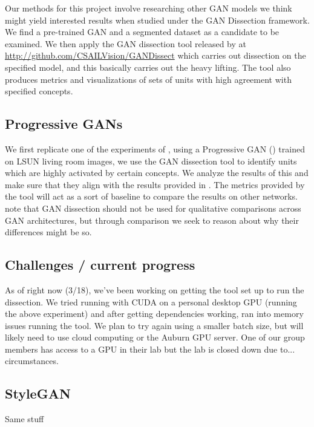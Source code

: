 \documentclass{article}
\begin{document}
Our methods for this project involve researching other GAN models we think might yield interested results when studied under the GAN Dissection \cite{gandissect2019} framework. We find a pre-trained GAN and a segmented dataset as a candidate to be examined. We then apply the GAN dissection tool released by \citet{gandissect2019} at \url{http://github.com/CSAILVision/GANDissect} which carries out dissection on the specified model, and this basically carries out the heavy lifting. The tool also produces metrics and visualizations of sets of units with high agreement with specified concepts. 

\subsection{Progressive GANs}

We first replicate one of the experiments of \citet{gandissect2019}, using a Progressive GAN (\cite{progan2017}) trained on LSUN living room images, we use the GAN dissection tool to identify units which are highly activated by certain concepts. We analyze the results of this and make sure that they align with the results provided in \citet{gandissect2019}. The metrics provided by the tool will act as a sort of baseline to compare the results on other networks. \citet{gandissect2019} note that GAN dissection should not be used for qualitative comparisons across GAN architectures, but through comparison we seek to reason about why their differences might be so.

\subsection{Challenges / current progress}

As of right now (3/18), we've been working on getting the tool set up to run the dissection. We tried running with CUDA on a personal desktop GPU (running the above experiment) and after getting dependencies working, ran into memory issues running the tool. We plan to try again using a smaller batch size, but will likely need to use cloud computing or the Auburn GPU server. One of our group members has access to a GPU in their lab but the lab is closed down due to... circumstances. 

\subsection{StyleGAN }

Same stuff
\end{document}
